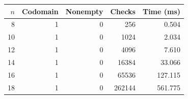 \begin{tabular}{rrrrr}
\toprule
$n$ & Codomain & Nonempty & Checks & Time (ms) \\
\midrule
8 & 1 & 0 & 256 & 0.504 \\
10 & 1 & 0 & 1024 & 2.034 \\
12 & 1 & 0 & 4096 & 7.610 \\
14 & 1 & 0 & 16384 & 33.066 \\
16 & 1 & 0 & 65536 & 127.115 \\
18 & 1 & 0 & 262144 & 561.775 \\
\bottomrule
\end{tabular}